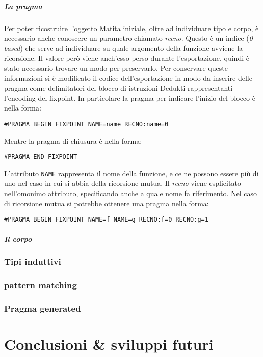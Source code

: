 \documentclass[12pt,a4paper]{report}
\begin{document}
\paragraph{La pragma} Per poter ricostruire l'oggetto Matita iniziale, oltre
ad individuare tipo e corpo, è necessario anche conoscere un parametro chiamato
\textit{recno}. Questo è un indice (\textit{0-based}) che serve ad individuare
su quale argomento della funzione avviene la ricorsione. Il valore però viene
anch'esso perso durante l'esportazione, quindi è stato necessario trovare un
modo per preservarlo. Per conservare queste informazioni si è modificato il
codice dell'esportazione in modo da inserire delle pragma come delimitatori
del blocco di istruzioni Dedukti rappresentanti l'encoding del fixpoint.
In particolare la pragma per indicare l'inizio del blocco è nella forma:
\begin{center}
\texttt{\#PRAGMA BEGIN FIXPOINT NAME=name RECNO:name=0}
\end{center}
Mentre la pragma di chiusura è nella forma:
\begin{center}
\texttt{\#PRAGMA END FIXPOINT}
\end{center}

L'attributo \texttt{NAME} rappresenta il nome della funzione, e ce ne possono
essere più di uno nel caso in cui si abbia della ricorsione mutua. Il \textit{recno}
viene esplicitato nell'omonimo attributo, specificando anche a quale nome fa
riferimento. Nel caso di ricorsione mutua si potrebbe ottenere una pragma nella
forma:
\begin{center}
\texttt{\#PRAGMA BEGIN FIXPOINT NAME=f NAME=g RECNO:f=0 RECNO:g=1}
\end{center}

\paragraph{Il corpo}

\subsection{Tipi induttivi}

\subsection{pattern matching}

\subsection{Pragma generated}

\chapter{Conclusioni \& sviluppi futuri}

\end{document}
